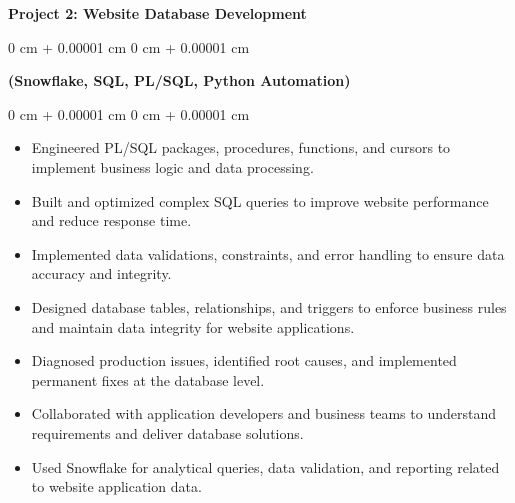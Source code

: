 \documentclass[10pt, letterpaper]{article}
\newenvironment{highlights}{
    \begin{itemize}[
        topsep=0.10 cm,
        parsep=0.10 cm,
        partopsep=0pt,
        itemsep=0pt,
        leftmargin=0 cm + 10pt
    ]
}{
    \end{itemize}
} %
\newenvironment{onecolentry}{
    \begin{adjustwidth}{
        0 cm + 0.00001 cm
    }{
        0 cm + 0.00001 cm
    }
}{
    \end{adjustwidth}
} %
\begin{document}
        \vspace{0.30 cm}
        \textbf{Project 2: Website Database Development}
        \begin{onecolentry}
        \vspace{0.15 cm}
        \textbf{(Snowflake, SQL, PL/SQL, Python Automation)}

        \end{onecolentry}
        \vspace{0.35 cm}
        \begin{onecolentry}
            \begin{highlights}
\item Engineered PL/SQL packages, procedures, functions, and cursors to implement business logic and data processing.
\item Built and optimized complex SQL queries to improve website performance and reduce response time.
\item Implemented data validations, constraints, and error handling to ensure data accuracy and integrity.
\item Designed database tables, relationships, and triggers to enforce business rules and maintain data integrity for website applications.
\item Diagnosed production issues, identified root causes, and implemented permanent fixes at the database level.
\item Collaborated with application developers and business teams to understand requirements and deliver database solutions.
\item Used Snowflake for analytical queries, data validation, and reporting related to website application data.




            \end{highlights}
        \end{onecolentry}
\end{document}
